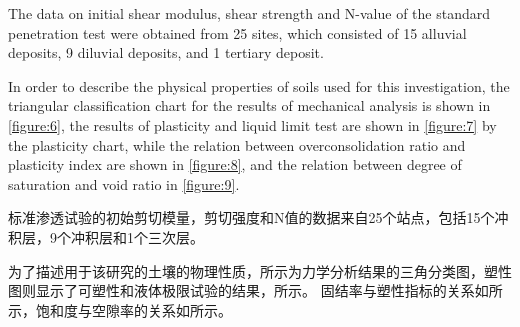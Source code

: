 


\begin{paracol}{2}
    
    The data on initial shear modulus, shear strength and N-value of the standard penetration test were obtained from 25 sites, which consisted of 15 alluvial deposits, 9 diluvial deposits, and 1 tertiary deposit.

    In order to describe the physical properties of soils used for this investigation, the triangular classification chart for the results of mechanical analysis is shown in \autoref{figure:6}, the results of plasticity and liquid limit test are shown in \autoref{figure:7} by the plasticity chart, while the relation between overconsolidation ratio and plasticity index are shown in \autoref{figure:8}, and the relation between degree of saturation and void ratio in \autoref{figure:9}.

    \switchcolumn

    标准渗透试验的初始剪切模量，剪切强度和N值的数据来自25个站点，包括15个冲积层，9个冲积层和1个三次层。
   
    为了描述用于该研究的土壤的物理性质，所示为力学分析结果的三角分类图，塑性图则显示了可塑性和液体极限试验的结果，所示。 固结率与塑性指标的关系如所示，饱和度与空隙率的关系如所示。

\end{paracol}



